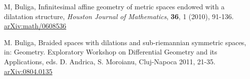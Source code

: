 \documentclass{article}
\begin{document}
\begin{thebibliography}{99}
 M, Buliga, Infinitesimal affine geometry of metric spaces endowed with a dilatation structure, {\it Houston Journal of Mathematics}, {\bf 36}, 1 (2010), 91-136. \\ 
\href{https://arxiv.org/abs/0804.0135}{arXiv:math/0608536}


 M. Buliga, Braided spaces with dilations and sub-riemannian symmetric spaces, in: Geometry. Exploratory Workshop on Differential Geometry and its Applications, eds. D. Andrica, S. Moroianu, Cluj-Napoca 2011, 21-35. \\   
\href{https://arxiv.org/abs/1005.5031}{arXiv:0804.0135}



\end{thebibliography}
\end{document}
